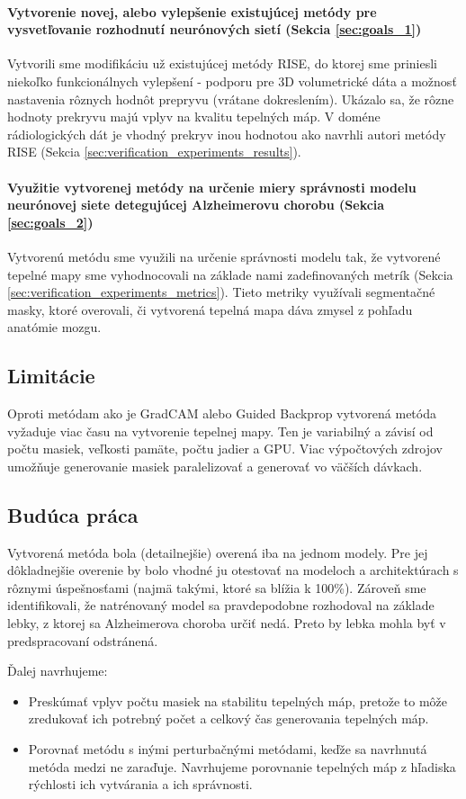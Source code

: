 \paragraph{Vytvorenie novej, alebo vylepšenie existujúcej metódy pre vysvetľovanie rozhodnutí neurónových sietí (Sekcia \ref{sec:goals_1})}

Vytvorili sme modifikáciu už existujúcej metódy RISE, do ktorej sme priniesli niekoľko funkcionálnych vylepšení - podporu pre 3D volumetrické dáta a možnosť nastavenia rôznych hodnôt prepryvu (vrátane dokreslením). Ukázalo sa, že rôzne hodnoty prekryvu majú vplyv na kvalitu tepelných máp. V doméne rádiologických dát je vhodný prekryv inou hodnotou ako navrhli autori metódy RISE (Sekcia \ref{sec:verification_experiments_results}).

\paragraph{Využitie vytvorenej metódy na určenie miery správnosti modelu neurónovej siete detegujúcej Alzheimerovu chorobu (Sekcia \ref{sec:goals_2})}

Vytvorenú metódu sme využili na určenie správnosti modelu tak, že vytvorené tepelné mapy sme vyhodnocovali na základe nami zadefinovaných metrík (Sekcia \ref{sec:verification_experiments_metrics}). Tieto metriky využívali segmentačné masky, ktoré overovali, či vytvorená tepelná mapa dáva zmysel z pohľadu anatómie mozgu.

\subsection{Limitácie}

Oproti metódam ako je GradCAM alebo Guided Backprop vytvorená metóda vyžaduje viac času na vytvorenie tepelnej mapy. Ten je variabilný a závisí od počtu masiek, veľkosti pamäte, počtu jadier a GPU. Viac výpočtových zdrojov umožňuje generovanie masiek paralelizovať a generovať vo väčších dávkach.

\subsection{Budúca práca}

Vytvorená metóda bola (detailnejšie) overená iba na jednom modely. Pre jej dôkladnejšie overenie by bolo vhodné ju otestovať na modeloch a architektúrach s rôznymi úspešnosťami (najmä takými, ktoré sa blížia k 100\%). Zároveň sme identifikovali, že natrénovaný model sa pravdepodobne rozhodoval na základe lebky, z ktorej sa Alzheimerova choroba určiť nedá. Preto by lebka mohla byť v predspracovaní odstránená.

Ďalej navrhujeme:

\begin{itemize}
    \item Preskúmať vplyv počtu masiek na stabilitu tepelných máp, pretože to môže zredukovať ich potrebný počet a celkový čas generovania tepelných máp.
    \item Porovnať metódu s inými perturbačnými metódami, keďže sa navrhnutá metóda medzi ne zaraďuje. Navrhujeme porovnanie tepelných máp z hľadiska rýchlosti ich vytvárania a ich správnosti.
\end{itemize}
